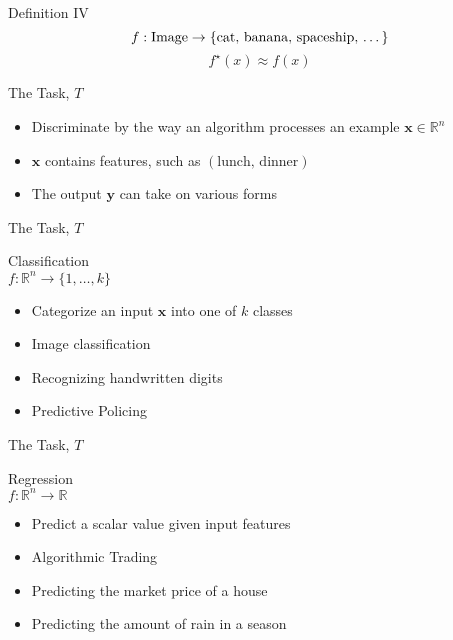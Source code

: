 \begin{slide}{Definition IV}
  $$f: \text{Image} \rightarrow \{\text{cat, banana, spaceship, \dots}\}$$
  \vspace{0.5cm}
  \pause
  $$f^\star(x) \approx f(x)$$
\end{slide}

\begin{slide}{The Task, $T$}
\begin{itemize}
  \pause\item Discriminate by the way an algorithm processes an example $\textbf{x} \in \mathbb{R}^n$
  \pause\item $\textbf{x}$ contains features, such as $(\text{lunch, dinner})$ %
  \pause\item The output $\textbf{y}$ can take on various forms
\end{itemize}
\end{slide}

\begin{slide}{The Task, $T$}
  \begin{center}
    {\Large
    Classification}\\
    \vspace{0.3cm}
    $f: \mathbb{R}^n \rightarrow \{1, \dots, k\}$
  \end{center}
  \begin{itemize}
    \pause\item Categorize an input $\textbf{x}$ into one of $k$ classes
    \pause\item Image classification
    \pause\item Recognizing handwritten digits
    \pause\item Predictive Policing %
  \end{itemize}
\end{slide}

\begin{slide}{The Task, $T$}
  \begin{center}
    {\Large
    Regression}\\
    \vspace{0.3cm}
    $f: \mathbb{R}^n \rightarrow \mathbb{R}$
  \end{center}
  \begin{itemize}
    \pause\item Predict a scalar value given input features
    \pause\item Algorithmic Trading %
    \pause\item Predicting the market price of a house %
    \pause\item Predicting the amount of rain in a season
  \end{itemize}
\end{slide}

